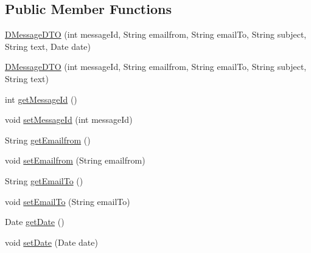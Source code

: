 \subsection*{Public Member Functions}
\begin{DoxyCompactItemize}
\item 
\mbox{\hyperlink{classes_1_1deusto_1_1bspq18_1_1e6_1_1_deusto_box_1_1_server_1_1dto_1_1_d_message_d_t_o_ace752421cec77a7f53cdabe642fad526}{D\+Message\+D\+TO}} (int message\+Id, String emailfrom, String email\+To, String subject, String text, Date date)
\item 
\mbox{\hyperlink{classes_1_1deusto_1_1bspq18_1_1e6_1_1_deusto_box_1_1_server_1_1dto_1_1_d_message_d_t_o_ae54a321f62f0942500914ea0da1e5b86}{D\+Message\+D\+TO}} (int message\+Id, String emailfrom, String email\+To, String subject, String text)
\item 
int \mbox{\hyperlink{classes_1_1deusto_1_1bspq18_1_1e6_1_1_deusto_box_1_1_server_1_1dto_1_1_d_message_d_t_o_a7fb95064573706795154f2555798ff4d}{get\+Message\+Id}} ()
\item 
void \mbox{\hyperlink{classes_1_1deusto_1_1bspq18_1_1e6_1_1_deusto_box_1_1_server_1_1dto_1_1_d_message_d_t_o_a1012200e8f0410f19db54bfd1cd356aa}{set\+Message\+Id}} (int message\+Id)
\item 
String \mbox{\hyperlink{classes_1_1deusto_1_1bspq18_1_1e6_1_1_deusto_box_1_1_server_1_1dto_1_1_d_message_d_t_o_ac1733f99216bbb77ad6a36bbb2584ec5}{get\+Emailfrom}} ()
\item 
void \mbox{\hyperlink{classes_1_1deusto_1_1bspq18_1_1e6_1_1_deusto_box_1_1_server_1_1dto_1_1_d_message_d_t_o_abec7a33026211e90f05d6d0514a74f80}{set\+Emailfrom}} (String emailfrom)
\item 
String \mbox{\hyperlink{classes_1_1deusto_1_1bspq18_1_1e6_1_1_deusto_box_1_1_server_1_1dto_1_1_d_message_d_t_o_a520bb545d1ab21a931441226f28af40c}{get\+Email\+To}} ()
\item 
void \mbox{\hyperlink{classes_1_1deusto_1_1bspq18_1_1e6_1_1_deusto_box_1_1_server_1_1dto_1_1_d_message_d_t_o_a09cf0f15c95abeb8730e3f97ee25d2d6}{set\+Email\+To}} (String email\+To)
\item 
Date \mbox{\hyperlink{classes_1_1deusto_1_1bspq18_1_1e6_1_1_deusto_box_1_1_server_1_1dto_1_1_d_message_d_t_o_a0bfded741cda7384cbaee79687408546}{get\+Date}} ()
\item 
void \mbox{\hyperlink{classes_1_1deusto_1_1bspq18_1_1e6_1_1_deusto_box_1_1_server_1_1dto_1_1_d_message_d_t_o_a931eaf6196266a0d66fc4f45badcc581}{set\+Date}} (Date date)
\item 

\end{DoxyCompactItemize}
